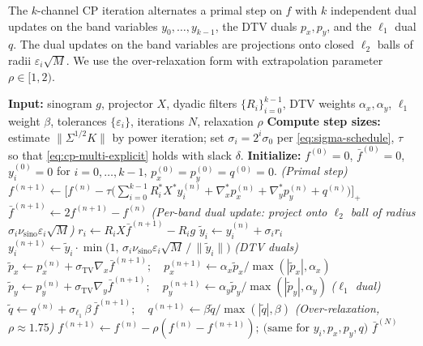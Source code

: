\documentclass{article}
\newcommand{\eps}{\varepsilon}
\begin{document}
The $k$-channel CP iteration alternates a primal step on $f$ with $k$
independent dual updates on the band variables $y_0, \ldots, y_{k-1}$,
the DTV duals $p_x, p_y$, and the $\ell_1$ dual $q$. The dual updates
on the band variables are projections onto closed $\ell_2$ balls of
radii $\eps_i \sqrt{M}$. We use the over-relaxation form with
extrapolation parameter $\rho \in [1, 2)$.

\begin{algorithm}[h]
\caption{Dyadic Multi-Channel CP for DTV-Regularized Limited-Angle CT}
\label{alg:multichannel-cp}
\begin{algorithmic}[1]
\State \textbf{Input:} sinogram $g$, projector $X$, dyadic filters $\{R_i\}_{i=0}^{k-1}$, DTV weights $\alpha_x, \alpha_y$, $\ell_1$ weight $\beta$, tolerances $\{\eps_i\}$, iterations $N$, relaxation $\rho$
\State \textbf{Compute step sizes:} estimate $\|\Sigma^{1/2} K\|$ by power iteration; set $\sigma_i = 2^i \sigma_0$ per \eqref{eq:sigma-schedule}, $\tau$ so that \eqref{eq:cp-multi-explicit} holds with slack $\delta$.
\State \textbf{Initialize:} $f^{(0)} = 0$, $\bar f^{(0)} = 0$, $y_i^{(0)} = 0$ for $i = 0,\ldots,k-1$, $p_x^{(0)} = p_y^{(0)} = q^{(0)} = 0$.
    \State \emph{(Primal step)}
    \State $f^{(n+1)} \gets \big[f^{(n)} - \tau\big(\sum_{i=0}^{k-1} R_i^* X^* y_i^{(n)}
        + \nabla_x^* p_x^{(n)} + \nabla_y^* p_y^{(n)} + q^{(n)}\big)\big]_+$
    \State $\bar f^{(n+1)} \gets 2 f^{(n+1)} - f^{(n)}$
        \State \emph{(Per-band dual update: project onto $\ell_2$ ball of radius $\sigma_i \nu_\text{sino} \eps_i \sqrt{M}$)}
        \State $r_i \gets R_i X \bar f^{(n+1)} - R_i g$
        \State $\tilde y_i \gets y_i^{(n)} + \sigma_i r_i$
        \State $y_i^{(n+1)} \gets \tilde y_i \cdot \min\!\big(1,\, \sigma_i \nu_\text{sino} \eps_i \sqrt{M}\,/\,\|\tilde y_i\|\big)$
    \EndFor
    \State \emph{(DTV duals)}
    \State $\tilde p_x \gets p_x^{(n)} + \sigma_\text{TV} \nabla_x \bar f^{(n+1)};\quad p_x^{(n+1)} \gets \alpha_x \tilde p_x / \max(|\tilde p_x|, \alpha_x)$
    \State $\tilde p_y \gets p_y^{(n)} + \sigma_\text{TV} \nabla_y \bar f^{(n+1)};\quad p_y^{(n+1)} \gets \alpha_y \tilde p_y / \max(|\tilde p_y|, \alpha_y)$
    \State \emph{($\ell_1$ dual)}
    \State $\tilde q \gets q^{(n)} + \sigma_{\ell_1}\, \beta\, \bar f^{(n+1)};\quad q^{(n+1)} \gets \beta \tilde q / \max(|\tilde q|, \beta)$
    \State \emph{(Over-relaxation, $\rho \approx 1.75$)}
    \State $f^{(n+1)} \gets f^{(n)} - \rho(f^{(n)} - f^{(n+1)});\ \text{(same for } y_i, p_x, p_y, q\text{)}$
\EndFor
\State \Return $\bar f^{(N)}$
\end{algorithmic}
\end{algorithm}
\end{document}
